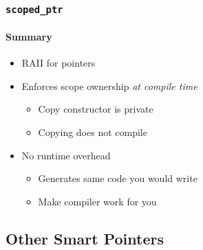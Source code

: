 \begin{frame}[fragile]
    \frametitle{\texttt{scoped\_ptr}}
    \framesubtitle{Summary}
    \begin{itemize}
        \item RAII for pointers
        \item Enforces scope ownership \emph{at compile time}
            \begin{itemize}
                \item Copy constructor is private
                \item Copying does not compile
            \end{itemize}
        \item No runtime overhead
            \begin{itemize}
                \item Generates same code you would write
                \item Make compiler work for you
            \end{itemize}
    \end{itemize}
\end{frame}



\subsection{Other Smart Pointers}
\frame{\subsectionpage}




